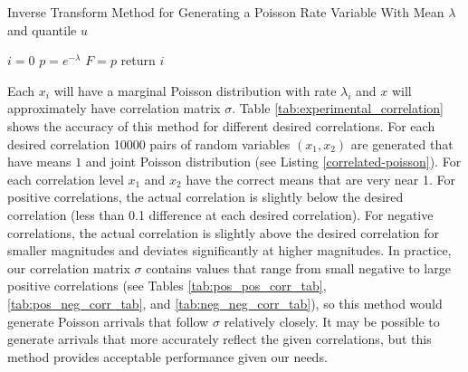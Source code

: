 \begin{algorithm}[H]
\SetAlgoLined
\caption{Inverse Transform Method for Generating a Poisson Rate Variable With Mean $\lambda$ and quantile $u$}
 $i = 0$\;
 $p = e^{-\lambda}$\;
 $F = p$\;
 return $i$ \;
\end{algorithm}

Each $x_i$ will have a marginal Poisson distribution with rate $\lambda_i$ and $x$ will approximately have correlation matrix $\sigma$. Table \ref{tab:experimental_correlation} shows the accuracy of this method for different desired correlations. For each desired correlation 10000 pairs of random variables $(x_1,x_2)$ are generated that have means $1$ and joint Poisson distribution (see Listing \ref{correlated-poisson}). For each correlation level $x_1$ and $x_2$ have the correct means that are very near 1. For positive correlations, the actual correlation is slightly below the desired correlation (less than 0.1 difference at each desired correlation). For negative correlations, the actual correlation is slightly above the desired correlation for smaller magnitudes and deviates significantly at higher magnitudes. In practice, our correlation matrix $\sigma$ contains values that range from small negative to large positive correlations (see Tables \ref{tab:pos_pos_corr_tab}, \ref{tab:pos_neg_corr_tab}, and \ref{tab:neg_neg_corr_tab}), so this method would generate Poisson arrivals that follow $\sigma$ relatively closely. It may be possible to generate arrivals that more accurately reflect the given correlations, but this method provides acceptable performance given our needs.

